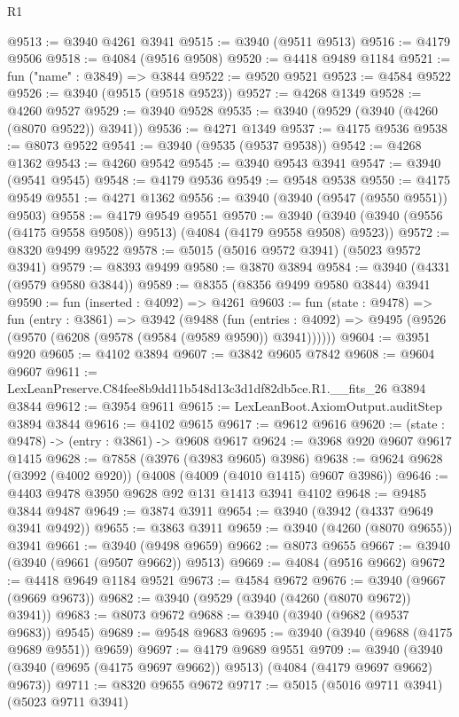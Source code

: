 \begin{lexlean}{R1}
\begin{coremodule}
@9513 := @3940 @4261 @3941
@9515 := @3940 (@9511 @9513)
@9516 := @4179 @9506
@9518 := @4084 (@9516 @9508)
@9520 := @4418 @9489 @1184
@9521 := fun ("name" : @3849) => @3844
@9522 := @9520 @9521
@9523 := @4584 @9522
@9526 := @3940 (@9515 (@9518 @9523))
@9527 := @4268 @1349
@9528 := @4260 @9527
@9529 := @3940 @9528
@9535 := @3940 (@9529 (@3940 (@4260 (@8070 @9522)) @3941))
@9536 := @4271 @1349
@9537 := @4175 @9536
@9538 := @8073 @9522
@9541 := @3940 (@9535 (@9537 @9538))
@9542 := @4268 @1362
@9543 := @4260 @9542
@9545 := @3940 @9543 @3941
@9547 := @3940 (@9541 @9545)
@9548 := @4179 @9536
@9549 := @9548 @9538
@9550 := @4175 @9549
@9551 := @4271 @1362
@9556 := @3940 (@3940 (@9547 (@9550 @9551)) @9503)
@9558 := @4179 @9549 @9551
@9570 := @3940 (@3940 (@3940 (@9556 (@4175 @9558 @9508)) @9513) (@4084 (@4179 @9558 @9508) @9523))
@9572 := @8320 @9499 @9522
@9578 := @5015 (@5016 @9572 @3941) (@5023 @9572 @3941)
@9579 := @8393 @9499
@9580 := @3870 @3894
@9584 := @3940 (@4331 (@9579 @9580 @3844))
@9589 := @8355 (@8356 @9499 @9580 @3844) @3941
@9590 := fun (inserted : @4092) => @4261
@9603 := fun (state : @9478) =>
  fun (entry : @3861) =>
  @3942
    (@9488
      (fun (entries : @4092) => @9495 (@9526 (@9570 (@6208 (@9578 (@9584 (@9589 @9590)) @3941))))))
@9604 := @3951 @920
@9605 := @4102 @3894
@9607 := @3842 @9605 @7842
@9608 := @9604 @9607
@9611 := LexLeanPreserve.C84fee8b9dd11b548d13c3d1df82db5ce.R1.__fits_26 @3894 @3844
@9612 := @3954 @9611
@9615 := LexLeanBoot.AxiomOutput.auditStep @3894 @3844
@9616 := @4102 @9615
@9617 := @9612 @9616
@9620 := (state : @9478) -> (entry : @3861) -> @9608 @9617
@9624 := @3968 @920 @9607 @9617 @1415
@9628 := @7858 (@3976 (@3983 @9605) @3986)
@9638 := @9624 @9628 (@3992 (@4002 @920)) (@4008 (@4009 (@4010 @1415) @9607 @3986))
@9646 := @4403 @9478 @3950 @9628 @92 @131 @1413 @3941 @4102
@9648 := @9485 @3844 @9487
@9649 := @3874 @3911
@9654 := @3940 (@3942 (@4337 @9649 @3941 @9492))
@9655 := @3863 @3911
@9659 := @3940 (@4260 (@8070 @9655)) @3941
@9661 := @3940 (@9498 @9659)
@9662 := @8073 @9655
@9667 := @3940 (@3940 (@9661 (@9507 @9662)) @9513)
@9669 := @4084 (@9516 @9662)
@9672 := @4418 @9649 @1184 @9521
@9673 := @4584 @9672
@9676 := @3940 (@9667 (@9669 @9673))
@9682 := @3940 (@9529 (@3940 (@4260 (@8070 @9672)) @3941))
@9683 := @8073 @9672
@9688 := @3940 (@3940 (@9682 (@9537 @9683)) @9545)
@9689 := @9548 @9683
@9695 := @3940 (@3940 (@9688 (@4175 @9689 @9551)) @9659)
@9697 := @4179 @9689 @9551
@9709 := @3940 (@3940 (@3940 (@9695 (@4175 @9697 @9662)) @9513) (@4084 (@4179 @9697 @9662) @9673))
@9711 := @8320 @9655 @9672
@9717 := @5015 (@5016 @9711 @3941) (@5023 @9711 @3941)

\end{coremodule}
\end{lexlean}
